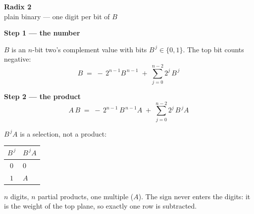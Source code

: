 \documentclass[fleqn]{article}
\begin{document}
\begin{center}
{\LARGE \textbf{Radix 2}}\\[4pt]
{\large plain binary --- one digit per bit of $B$}
\end{center}

\vspace{3em}

\noindent\textbf{Step 1 --- the number}

\noindent $B$ is an $n$-bit two's complement value with bits $B^{\,j} \in \{0, 1\}$.
The top bit counts negative:
\[
B \;=\; -\,2^{n-1} B^{\,n-1} \;+\; \sum_{j=0}^{n-2} 2^{j} \, B^{\,j}
\]

\vspace{0.5em}

\noindent\textbf{Step 2 --- the product}
\[
A \, B \;=\; -\,2^{n-1} \, B^{\,n-1} A \;+\; \sum_{j=0}^{n-2} 2^{j} \, B^{\,j} A
\]

\noindent $B^{\,j} A$ is a selection, not a product:

\vspace{1em}

\begin{center}
\renewcommand{\arraystretch}{1.35}
\begin{tabular}{c | l}
$B^{\,j}$ & \multicolumn{1}{c}{$B^{\,j} A$} \\
\hline
$0$ & $0$ \\
$1$ & $A$ \\
\end{tabular}
\end{center}

\vspace{1.5em}

\noindent $n$ digits, $n$ partial products, one multiple ($A$). The sign never enters the
digits: it is the weight of the top plane, so exactly one row is subtracted.
\end{document}

